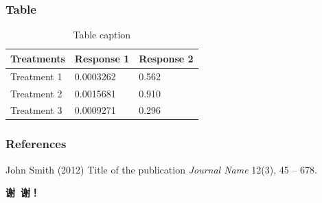\documentclass{beamer}
\theoremstyle{definition}
\numberwithin{equation}{section}
\begin{document}
    \begin{frame}
    	\frametitle{Table}
    	\begin{table}
    		\begin{tabular}{l l l}
    			\toprule
    			\textbf{Treatments} & \textbf{Response 1} & \textbf{Response 2}\\
    			\midrule
    			Treatment 1 & 0.0003262 & 0.562 \\
    			Treatment 2 & 0.0015681 & 0.910 \\
    			Treatment 3 & 0.0009271 & 0.296 \\
    			\bottomrule
    		\end{tabular}
    	    \caption{Table caption}
       \end{table}
    \end{frame}
	
	
	
	\begin{frame}
		\frametitle{References}
		\footnotesize{
			\begin{thebibliography}{99} %
				 John Smith (2012)
				\newblock Title of the publication
				\newblock \emph{Journal Name} 12(3), 45 -- 678.
			\end{thebibliography}
		}
	\end{frame}
	
	
	
	\begin{frame}
		\begin{center} {\bfseries \Large 谢\ 谢！} \end{center}
	\end{frame}
	
	
\end{document}
